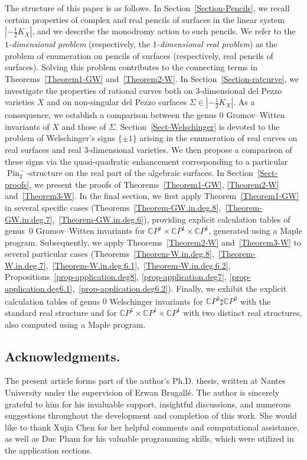 \documentclass[11pt]{amsart}
\numberwithin{equation}{section}
\theoremstyle{definition}
\theoremstyle{plain}
\theoremstyle{remark}
\newcommand{\C}{\mathbb{C}}
\DeclareMathOperator{\Pin}{Pin}
\begin{document}
 The structure of this paper is as follows. In Section~\ref{Section-Pencils}, we recall certain properties of complex and real pencils of surfaces in the linear system $|-\frac{1}{2}K_X|$, and we describe the monodromy action to such pencils. We refer to  the \textit{$1$-dimensional problem} (respectively, the \textit{$1$-dimensional real problem})
as the problem of enumeration on pencils of surfaces (respectively, real pencils of surfaces). Solving this problem contributes to the connecting terms in Theorems~\ref{Theorem1-GW} and~\ref{Theorem2-W}. In Section~\ref{Section-ratcurve}, we investigate the properties of rational curves both on $3$-dimensional del Pezzo varieties $X$ and on non-singular del Pezzo surfaces $\Sigma\in |-\frac{1}{2}K_X|$. As a consequence, we establish a comparison between the genus $0$ Gromov--Witten invariants of $X$ and those of $\Sigma$. Section~\ref{Sect-Welschinger} is devoted to the problem of  Welschinger's signs $\{\pm 1\}$ arising in the enumeration of real curves on real surfaces and real $3$-dimensional varieties. We then propose a comparison of these signs via the quasi-quadratic enhancement corresponding to a particular $\Pin_2^-$-structure on the real part of the algebraic surfaces.
In Section~\ref{Sect-proofs}, we present the proofs of Theorems~\ref{Theorem1-GW}, \ref{Theorem2-W} and~\ref{Theorem3-W}.
In the final section, we first apply Theorem~\ref{Theorem1-GW} in several specific cases (Theorems~\ref{Theorem-GW.in.deg.8},~\ref{Theorem-GW.in.deg.7},~\ref{Theorem-GW.in.deg.6}), providing explicit calculation tables of  genus~$0$ Gromov--Witten invariants for $\C P^1\times\C P^1\times \C P^1$, generated using a Maple program. Subsequently, we apply Theorems~\ref{Theorem2-W} and~\ref{Theorem3-W} to several particular cases (Theorems~\ref{Theorem-W.in.deg.8},~\ref{Theorem-W.in.deg.7},~\ref{Theorem-W.in.deg.6.1},~\ref{Theorem-W.in.deg.6.2}, Propositions~\ref{prop-application.deg8}, \ref{prop-application.deg7}, \ref{prop-application.deg6.1},~\ref{prop-application.deg6.2}). Finally, we exhibit the explicit calculation tables of genus $0$ Welschinger invariants for $\C P^3\sharp \overline{\C P^3}$ with the standard real structure and for  $\C P^1\times\C P^1\times \C P^1$ with  two distinct real structures, also computed using a Maple program. 

\subsection*{Acknowledgments.} The present article forms part of the author's Ph.D. thesis, written at Nantes University under the supervision of Erwan Brugall\'e. The author is sincerely grateful to him for his invaluable support, insightful discussions, and numerous suggestions throughout the development and completion of this work. She would like to thank Xujia Chen for her helpful comments and computational assistance, as well as Duc Pham for his valuable programming skills, which were utilized in the application sections. 
\end{document}
